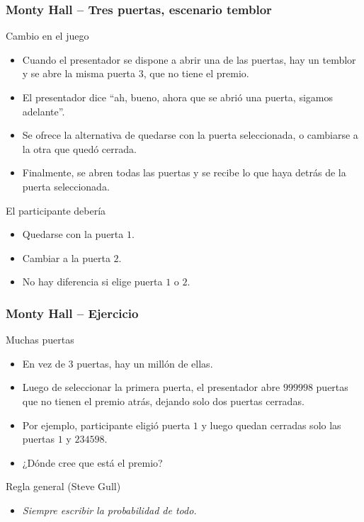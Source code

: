\documentclass[table]{beamer}
\begin{document}
\begin{frame}
    \frametitle{Monty Hall -- Tres puertas, escenario temblor}
    \begin{block}{Cambio en el juego}
        \begin{itemize}
            \item Cuando el presentador se dispone a abrir una de las puertas, hay un temblor y se abre la misma puerta $3$, que no tiene el premio.
            \item El presentador dice ``ah, bueno, ahora que se abrió una puerta, sigamos adelante''.
            \item Se ofrece la alternativa de quedarse con la puerta seleccionada, o cambiarse a la otra que quedó cerrada.
            \item Finalmente, se abren todas las puertas y se recibe lo que haya detrás de la puerta seleccionada.
        \end{itemize}
    \end{block}
    \begin{block}{El participante debería}
        \begin{itemize}
            \item Quedarse con la puerta $1$.
            \item Cambiar a la puerta $2$.
            \item No hay diferencia si elige puerta $1$ o $2$.
        \end{itemize}
    \end{block}
\end{frame}

\begin{frame}
    \frametitle{Monty Hall -- Ejercicio}
    \begin{block}{Muchas puertas}
        \begin{itemize}
            \item En vez de $3$ puertas, hay un millón de ellas.
            \item Luego de seleccionar la primera puerta, el presentador abre $999998$ puertas que no tienen el premio atrás, dejando solo dos puertas cerradas.
            \item Por ejemplo, participante eligió puerta $1$ y luego quedan cerradas solo las puertas $1$ y $234598$.
            \item ¿Dónde cree que está el premio?
        \end{itemize}
    \end{block}
    \begin{alertblock}{Regla general (Steve Gull)}
        \begin{itemize}
            \item \emph{Siempre escribir la probabilidad de todo.}
        \end{itemize}
    \end{alertblock}
\end{frame}
\end{document}
